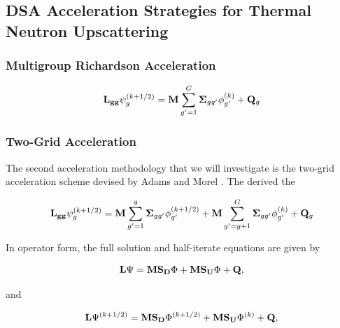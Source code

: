 \subsection{DSA Acceleration Strategies for Thermal Neutron Upscattering}
\label{sec::DSA_DSA_MG}

\subsubsection{Multigroup Richardson Acceleration}
\label{sec:DSA_DSA_MG_WGS}

\begin{equation}
\label{eq::DSA_WG_trans_it_eq}
{\bf L_{gg}} \psi_g^{(k+1/2)} =  {\bf M} \sum_{g'=1}^G {\bf \Sigma}_{g g'} \phi_{g'}^{(k)} + {\bf Q}_g
\end{equation}



\subsubsection{Two-Grid Acceleration}
\label{sec:DSA_DSA_MG_TG}

The second acceleration methodology that we will investigate is the two-grid acceleration scheme devised by Adams and Morel \cite{adams1993two}. The derived the 

\begin{equation}
\label{eq::DSA_TG_trans_it_eq}
{\bf L_{gg}} \psi_g^{(k+1/2)} = {\bf M} \sum_{g'=1}^g {\bf \Sigma}_{g g'} \phi_{g'}^{(k+1/2)} + {\bf M} \sum_{g'=g+1}^G {\bf \Sigma}_{g g'} \phi_{g'}^{(k)} + {\bf Q}_g
\end{equation}

\noindent In operator form, the full solution and half-iterate equations are given by

\begin{equation}
\label{eq::DSA_TG_trans_eq_ops}
{\bf L} \Psi = {\bf M} {\bf S_D} \Phi + {\bf M} {\bf S_U} \Phi + {\bf Q} ,
\end{equation}

\noindent and

\begin{equation}
\label{eq::DSA_TG_trans_it_eq_ops}
{\bf L} \Psi^{(k+1/2)} = {\bf M} {\bf S_D} \Phi^{(k+1/2)} + {\bf M} {\bf S_U} \Phi^{(k)} + {\bf Q} ,
\end{equation}

